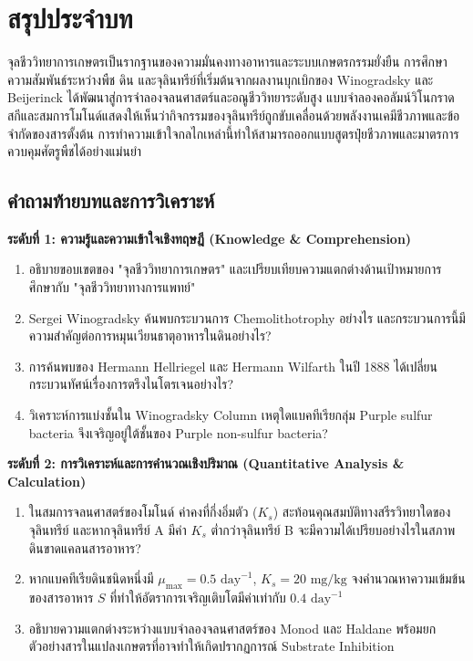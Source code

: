 \section*{สรุปประจำบท}

จุลชีววิทยาการเกษตรเป็นรากฐานของความมั่นคงทางอาหารและระบบเกษตรกรรมยั่งยืน การศึกษาความสัมพันธ์ระหว่างพืช ดิน และจุลินทรีย์ที่เริ่มต้นจากผลงานบุกเบิกของ Winogradsky และ Beijerinck ได้พัฒนาสู่การจำลองจลนศาสตร์และอณูชีววิทยาระดับสูง แบบจำลองคอลัมน์วิโนกราดสกีและสมการโมโนด์แสดงให้เห็นว่ากิจกรรมของจุลินทรีย์ถูกขับเคลื่อนด้วยพลังงานเคมีชีวภาพและข้อจำกัดของสารตั้งต้น การทำความเข้าใจกลไกเหล่านี้ทำให้สามารถออกแบบสูตรปุ๋ยชีวภาพและมาตรการควบคุมศัตรูพืชได้อย่างแม่นยำ

\subsection*{คำถามท้ายบทและการวิเคราะห์}

\noindent \textbf{ระดับที่ 1: ความรู้และความเข้าใจเชิงทฤษฎี (Knowledge \& Comprehension)}
\begin{enumerate}
    \item อธิบายขอบเขตของ "จุลชีววิทยาการเกษตร" และเปรียบเทียบความแตกต่างด้านเป้าหมายการศึกษากับ "จุลชีววิทยาทางการแพทย์"
    \item Sergei Winogradsky ค้นพบกระบวนการ Chemolithotrophy อย่างไร และกระบวนการนี้มีความสำคัญต่อการหมุนเวียนธาตุอาหารในดินอย่างไร?
    \item การค้นพบของ Hermann Hellriegel และ Hermann Wilfarth ในปี 1888 ได้เปลี่ยนกระบวนทัศน์เรื่องการตรึงไนโตรเจนอย่างไร?
    \item วิเคราะห์การแบ่งชั้นใน Winogradsky Column เหตุใดแบคทีเรียกลุ่ม Purple sulfur bacteria จึงเจริญอยู่ใต้ชั้นของ Purple non-sulfur bacteria?
\end{enumerate}

\noindent \textbf{ระดับที่ 2: การวิเคราะห์และการคำนวณเชิงปริมาณ (Quantitative Analysis \& Calculation)}
\begin{enumerate}[resume]
    \item ในสมการจลนศาสตร์ของโมโนด์ ค่าคงที่กึ่งอิ่มตัว ($K_s$) สะท้อนคุณสมบัติทางสรีรวิทยาใดของจุลินทรีย์ และหากจุลินทรีย์ A มีค่า $K_s$ ต่ำกว่าจุลินทรีย์ B จะมีความได้เปรียบอย่างไรในสภาพดินขาดแคลนสารอาหาร?
    \item หากแบคทีเรียดินชนิดหนึ่งมี $\mu_{\max} = 0.5\text{ day}^{-1}$, $K_s = 20\text{ mg/kg}$ จงคำนวณหาความเข้มข้นของสารอาหาร $S$ ที่ทำให้อัตราการเจริญเติบโตมีค่าเท่ากับ $0.4\text{ day}^{-1}$
    \item อธิบายความแตกต่างระหว่างแบบจำลองจลนศาสตร์ของ Monod และ Haldane พร้อมยกตัวอย่างสารในแปลงเกษตรที่อาจทำให้เกิดปรากฏการณ์ Substrate Inhibition
\end{enumerate}

